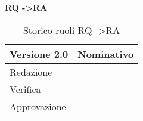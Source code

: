 \textbf{RQ -\textgreater RA}

\begin{table}[h]
\begin{center}

\begin{tabular}{p{} p{}}
\toprule
\textbf{Versione 2.0}	&	\textbf{Nominativo}\\
\midrule
\midrule
Redazione	&	\SL \\
\midrule
Verifica &	\DC	\\
\midrule
Approvazione	&	\MB	\\
\bottomrule
\end{tabular}
\caption{Storico ruoli RQ -\textgreater RA}
\label{tabVers2}
\end{center}
\end{table}